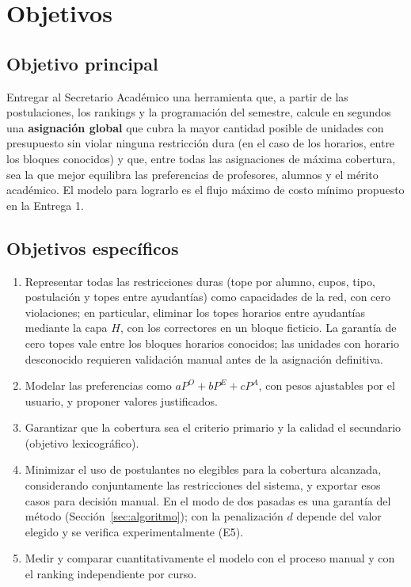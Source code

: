 \documentclass{article}
\begin{document}
\section{Objetivos}
\label{sec:objetivos}

\subsection{Objetivo principal}

Entregar al Secretario Académico una herramienta que, a partir de las postulaciones, los rankings y la programación del semestre, calcule en segundos una \textbf{asignación global} que cubra la mayor cantidad posible de unidades con presupuesto sin violar ninguna restricción dura (en el caso de los horarios, entre los bloques conocidos) y que, entre todas las asignaciones de máxima cobertura, sea la que mejor equilibra las preferencias de profesores, alumnos y el mérito académico. El modelo para lograrlo es el flujo máximo de costo mínimo propuesto en la Entrega 1.

\subsection{Objetivos específicos}

\begin{enumerate}
    \item[OE1.] Representar todas las restricciones duras (tope por alumno, cupos, tipo, postulación y topes entre ayudantías) como capacidades de la red, con cero violaciones; en particular, eliminar los topes horarios entre ayudantías mediante la capa $H$, con los correctores en un bloque ficticio. La garantía de cero topes vale entre los bloques horarios conocidos; las unidades con horario desconocido requieren validación manual antes de la asignación definitiva.
    \item[OE2.] Modelar las preferencias como $aP^O + bP^E + cP^A$, con pesos ajustables por el usuario, y proponer valores justificados.
    \item[OE3.] Garantizar que la cobertura sea el criterio primario y la calidad el secundario (objetivo lexicográfico).
    \item[OE4.] Minimizar el uso de postulantes no elegibles para la cobertura alcanzada, considerando conjuntamente las restricciones del sistema, y exportar esos casos para decisión manual. En el modo de dos pasadas es una garantía del método (Sección~\ref{sec:algoritmo}); con la penalización $d$ depende del valor elegido y se verifica experimentalmente (E5).
    \item[OE5.] Medir y comparar cuantitativamente el modelo con el proceso manual y con el ranking independiente por curso.
\end{enumerate}
\end{document}
